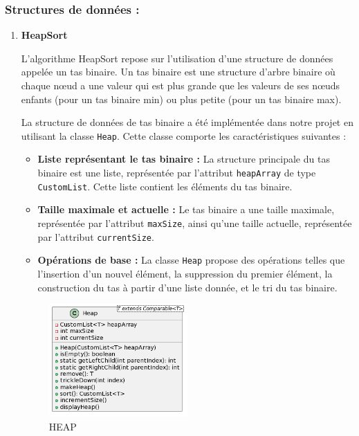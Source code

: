 \documentclass[a4paper,12pt]{article}
\begin{document}
\subsubsection{Structures de données :}
   
\begin{enumerate}[label=\textbf{\arabic*.} , font=\bfseries]
  

\item \textbf{HeapSort}

L'algorithme HeapSort repose sur l'utilisation d'une structure de données appelée un tas binaire. Un tas binaire est une structure d'arbre binaire où chaque nœud a une valeur qui est plus grande que les valeurs de ses nœuds enfants (pour un tas binaire min) ou plus petite (pour un tas binaire max).

La structure de données de tas binaire a été implémentée dans notre projet en utilisant la classe \texttt{Heap}. Cette classe comporte les caractéristiques suivantes :

\begin{itemize}
    \item \textbf{Liste représentant le tas binaire :} La structure principale du tas binaire est une liste, représentée par l'attribut \texttt{heapArray} de type \texttt{CustomList}. Cette liste contient les éléments du tas binaire.
    \item \textbf{Taille maximale et actuelle :} Le tas binaire a une taille maximale, représentée par l'attribut \texttt{maxSize}, ainsi qu'une taille actuelle, représentée par l'attribut \texttt{currentSize}.
    \item \textbf{Opérations de base :} La classe \texttt{Heap} propose des opérations telles que l'insertion d'un nouvel élément, la suppression du premier élément, la construction du tas à partir d'une liste donnée, et le tri du tas binaire.
\end{itemize}

\begin{figure}[H]
    \centering
    \includegraphics[width=0.5\textwidth]{Heap.png}
    \caption{HEAP}
    \label{fig:heap}
\end{figure}


\end{enumerate}
\end{document}
